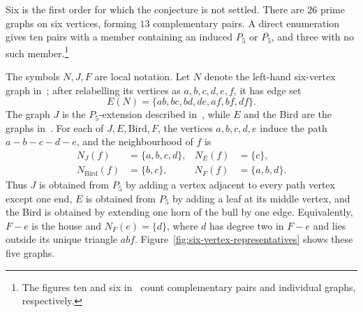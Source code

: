 \documentclass[11pt]{article}
\numberwithin{equation}{section}
\theoremstyle{plain}
\theoremstyle{definition}
\begin{document}
Six is the first order for which the conjecture is not settled.  There
are $26$ prime graphs on six vertices, forming $13$ complementary
pairs.  A direct enumeration gives ten pairs
with a member containing an induced $P_5$ or $\overline{P_5}$, and
three with no such member.\footnote{The figures ten
and six in~\cite[p.~4]{NguyenScottSeymourDensityIV} count complementary
pairs and individual graphs, respectively.}

The symbols $N,J,F$ are local notation.  Let $N$ denote the left-hand
six-vertex graph in~\cite[Figure~1]{NguyenScottSeymourDensityIV}; after
relabelling its vertices as $a,b,c,d,e,f$, it has edge set
\[
             E(N)=\{ab,bc,bd,de,af,bf,df\}.
\]
The graph $J$ is the $P_5$-extension described
in~\cite[p.~22]{NguyenScottSeymourDensityIV}, while $E$ and the Bird are
the graphs in~\cite[Figures~4 and~5]{HuangJuZhou2026}.
For each of $J,E,\mathrm{Bird},F$, the vertices $a,b,c,d,e$ induce the
path $a-b-c-d-e$, and the neighbourhood of $f$ is
\[
 \begin{aligned}
 N_J(f)&=\{a,b,c,d\}, & N_E(f)&=\{c\},\\
 N_{\mathrm{Bird}}(f)&=\{b,c\}, & N_F(f)&=\{a,b,d\}.
 \end{aligned}
\]
Thus $J$ is obtained from $P_5$ by adding a vertex adjacent to every
path vertex except one end, $E$ is obtained from $P_5$ by adding a leaf
at its middle vertex, and the Bird is obtained by extending one horn of
the bull by one edge.  Equivalently, $F-e$ is the house and
$N_F(e)=\{d\}$, where $d$ has degree two in $F-e$ and lies outside its
unique triangle $abf$.
Figure~\ref{fig:six-vertex-representatives} shows these five graphs.
\end{document}
